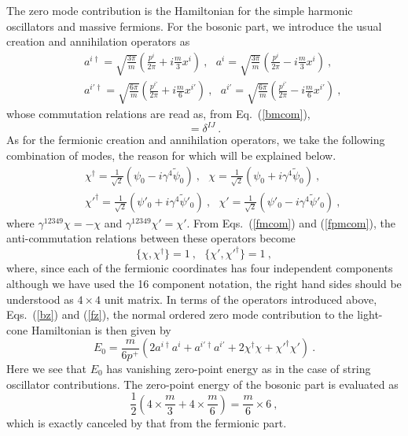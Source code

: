 \documentclass[a4paper,12pt]{article}
\begin{document}
The zero mode contribution is the Hamiltonian for the simple harmonic
oscillators and massive fermions.  For the bosonic part, we introduce
the usual creation and annihilation operators as
\begin{eqnarray}
& & a^{i \dagger} = \sqrt{ \frac{3 \pi}{m} }  
      \left( \frac{p^i}{2 \pi} + i \frac{m}{3} x^i \right)~,
 ~~~a^i = \sqrt{ \frac{3 \pi}{m} }
      \left( \frac{p^i}{2 \pi} - i \frac{m}{3} x^i \right)~,
  \nonumber \\
& & a^{i' \dagger} = \sqrt{ \frac{6 \pi}{m} }
    \left( \frac{p^{i'}}{2 \pi} + i \frac{m}{6} x^{i'} \right)~,
 ~~~a^{i'} = \sqrt{ \frac{6 \pi}{m} }
    \left( \frac{p^{i'}}{2 \pi} - i \frac{m}{6} x^{i'} \right)~,
\label{bz}
\end{eqnarray}
whose commutation relations are read as, from Eq.~(\ref{bmcom}),
\begin{equation}
[ a^I, a^{J \dagger} ] = \delta^{IJ}~.
\end{equation}
As for the fermionic creation and annihilation operators, we take the
following combination of modes, the reason for which will be explained
below.
\begin{eqnarray}
& & \chi^\dagger = \frac{1}{\sqrt{2}} 
             ( \psi_0 - i \gamma^4 \tilde{\psi}_0 )~,
 ~~~\chi = \frac{1}{\sqrt{2}} 
             ( \psi_0 + i \gamma^4 \tilde{\psi}_0 )~,
  \nonumber \\
& & \chi'^\dagger = \frac{1}{\sqrt{2}} 
             ( \psi'_0 + i \gamma^4 \tilde{\psi}'_0 )~,
 ~~~\chi' = \frac{1}{\sqrt{2}} 
             ( \psi'_0 - i \gamma^4 \tilde{\psi}'_0 )~,
\label{fz}
\end{eqnarray}
where $\gamma^{12349} \chi = - \chi$ and $\gamma^{12349} \chi' = 
\chi'$.  From Eqs.~(\ref{fmcom}) and (\ref{fpmcom}), the
anti-commutation relations between these operators become
\begin{equation}
\{ \chi, \chi^\dagger \} = 1 ~, ~~~
\{ \chi', \chi'^\dagger \} = 1 ~,
\end{equation}
where, since each of the fermionic coordinates has four independent
components although we have used the 16 component notation, the right
hand sides should be understood as $4 \times 4$ unit matrix.  In terms
of the operators introduced above, Eqs.~(\ref{bz}) and (\ref{fz}), the
normal ordered zero mode contribution to the light-cone Hamiltonian is
then given by
\begin{equation}
E_0 = \frac{m}{6 p^+} 
     ( 2 a^{i \dagger} a^i + a^{i' \dagger} a^{i'}
       + 2 \chi^\dagger \chi + \chi'^\dagger \chi' )~.
\label{zero-h}
\end{equation}
Here we see that $E_0$ has vanishing zero-point energy as in the case
of string oscillator contributions.  The zero-point energy of the
bosonic part is evaluated as
\[
\frac{1}{2} \left( 4 \times \frac{m}{3} + 4 \times \frac{m}{6} \right)
= \frac{m}{6} \times 6 ~,
\]
which is exactly canceled by that from the fermionic part.
\end{document}

